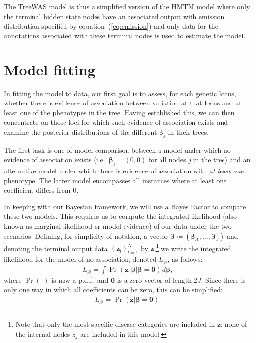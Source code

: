 \documentclass[10pt]{article}
\newcommand{\B}{\symbf{\beta}}
\begin{document}
The TreeWAS model is thus a simplified version of the HMTM model where only the terminal hidden state nodes have an associated output with emission distribution specified by equation~(\ref{eq:emission}) and only data for the annotations associated with these terminal nodes is used to estimate the model.


\section{Model fitting}

In fitting the model to data, our first goal is to assess, for each genetic locus, whether there is evidence of association between variation at that locus and at least one of the
phenotypes in the tree. Having established this, we can then concentrate on those loci for which such evidence of association exists and examine the posterior distributions of the different $\B_j$ in their trees. %

The first task is one of model comparison between a model under which no evidence of association exists (i.e.\ $\symbf{\beta_j}=(0,0)$ for all nodes $j$ in the tree) and an alternative model under which there is evidence of association with \textit{at least one} phenotype. The latter model encompasses all instances where at least one coefficient differs from 0.

In keeping with our Bayesian framework, we will use a Bayes Factor to compare these two models. This requires us to compute the integrated likelihood (also known as marginal likelihood or model evidence) of our data under the two scenarios. Defining, for simplicity of notation, a vector $\B \coloneqq (\B_A,\ldots,\B_J)$ and denoting the terminal output data $\left\{\symbf{z}_l\right\}_{l=1}^N$ by $\symbf{z}$,\footnote{Note that only the most specific disease categories are included in $\symbf{z}$: none of the internal nodes $z_j$ are included in this model.} we write the integrated likelihood for the model of no association, denoted $L_\varnothing$, as follows:
\begin{align*}
  L_\varnothing = \int \Pr( \symbf{z}, \B |
  \B = \symbf{0})\, d\B,
\end{align*}
where $\Pr(\cdot)$ is now a p.d.f.\ and $\symbf{0}$ is a zero vector of length $2J$. Since there is only one way in which all coefficients can be zero, this can be simplified:
\begin{align*}
  L_\varnothing = \Pr( \symbf{z} | \B = \symbf{0}).
\end{align*}
\end{document}

